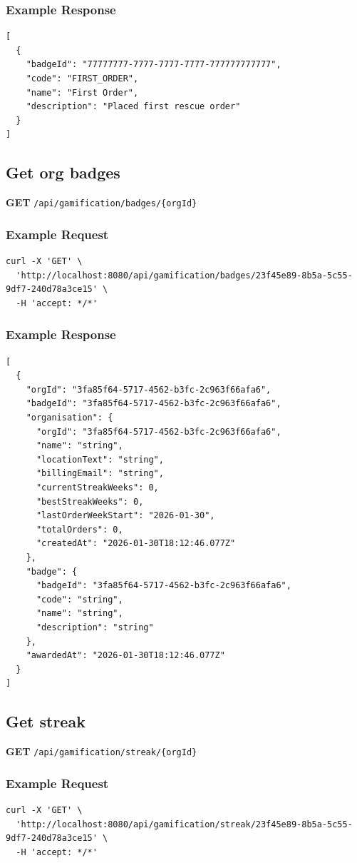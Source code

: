 \documentclass[a4paper,11pt]{article}
\begin{document}
\subsubsection*{Example Response}
\begin{lstlisting}
[
  {
    "badgeId": "77777777-7777-7777-7777-777777777777",
    "code": "FIRST_ORDER",
    "name": "First Order",
    "description": "Placed first rescue order"
  }
]
\end{lstlisting}

\subsection{Get org badges}
\textbf{GET} \texttt{/api/gamification/badges/\{orgId\}}
\subsubsection*{Example Request}
\begin{lstlisting}
curl -X 'GET' \
  'http://localhost:8080/api/gamification/badges/23f45e89-8b5a-5c55-9df7-240d78a3ce15' \
  -H 'accept: */*'
\end{lstlisting}

\subsubsection*{Example Response}
\begin{lstlisting}
[
  {
    "orgId": "3fa85f64-5717-4562-b3fc-2c963f66afa6",
    "badgeId": "3fa85f64-5717-4562-b3fc-2c963f66afa6",
    "organisation": {
      "orgId": "3fa85f64-5717-4562-b3fc-2c963f66afa6",
      "name": "string",
      "locationText": "string",
      "billingEmail": "string",
      "currentStreakWeeks": 0,
      "bestStreakWeeks": 0,
      "lastOrderWeekStart": "2026-01-30",
      "totalOrders": 0,
      "createdAt": "2026-01-30T18:12:46.077Z"
    },
    "badge": {
      "badgeId": "3fa85f64-5717-4562-b3fc-2c963f66afa6",
      "code": "string",
      "name": "string",
      "description": "string"
    },
    "awardedAt": "2026-01-30T18:12:46.077Z"
  }
]
\end{lstlisting}

\subsection{Get streak}
\textbf{GET} \texttt{/api/gamification/streak/\{orgId\}} 
\subsubsection*{Example Request}
\begin{lstlisting}
curl -X 'GET' \
  'http://localhost:8080/api/gamification/streak/23f45e89-8b5a-5c55-9df7-240d78a3ce15' \
  -H 'accept: */*'
\end{lstlisting}
\end{document}

